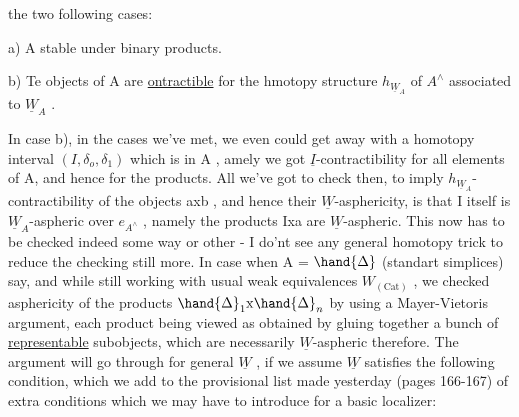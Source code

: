 
the two following cases:

a) A stable under binary products.

b) Te objects of A are \uline{ontractible} for the hmotopy structure $h_{\underline{W}_A}$
of $A^{\wedge}$\hand{/} associated to $\underline{W}_A$ .

In case b), in the cases we've met, we even could get away with
a homotopy interval   $(I,\delta_o,\delta_1)$ 
which is in A , amely we got $\underline{I}$-contractibility for all elements of A,
and hence for the products. All we've got to check then, to imply
$h_{\underline{W}_A}$-contractibility of the objects axb ,  and hence  their
$\underline{W}$-asphericity, is that I itself is $\underline{W}_A$-aspheric over $e_{A^\wedge}$ , namely the
products Ixa are $\underline{W}$-aspheric. This now has to be checked indeed some
way or other - I do'nt see any general homotopy trick to reduce the
checking still more. In case when A = $\hand{\Delta}$ (standart simplices) say, 
and while still working with usual weak equivalences $W_{(\mathrm{Cat})}$ , we checked
asphericity of the products $\hand{\Delta}_1 \mathrm{x} \hand{\Delta}_n$ by using a Mayer-Vietoris argument,
each product being viewed as obtained by gluing together a bunch of
\uline{representable} subobjects, which are necessarily $\underline{W}$-aspheric therefore.
The argument will go through for general $\underline{W}$ , if we assume $\underline{W}$ satisfies
the following condition, which we add to the provisional list made
yesterday (pages 166-167) of extra conditions  which we may have to
introduce for a basic localizer:

